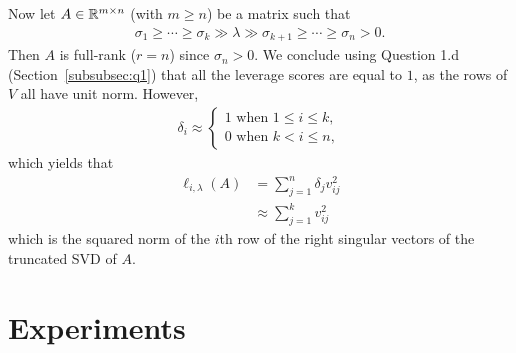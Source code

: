\documentclass{article}
\begin{document}
Now let $A \in {\mathbb R}^{m \times n}$ (with $m \geq n$) be a matrix such that
\begin{align*}
  \sigma_1 \geq \cdots \geq \sigma_k \gg \lambda \gg \sigma_{k + 1} \geq \cdots \geq \sigma_n > 0.
\end{align*}
Then $A$ is full-rank ($r = n$) since $\sigma_n > 0$.
We conclude using Question 1.d (Section~\ref{subsubsec:q1}) that all the
leverage scores are equal to $1$, as the rows of $V$ all have unit norm.
However,
\begin{align*}
  \delta_i \approx
  \begin{cases}
    1 \text{ when } 1 \leq i \leq k,\\
    0 \text{ when } k < i \leq n,
  \end{cases}
\end{align*}
which yields that
\begin{align*}
  \ell_{i,\lambda}(A) &= \sum_{j = 1}^n \delta_j v_{ij}^2\\
                      &\approx \sum_{j = 1}^k v_{ij}^2
\end{align*}
which is the squared norm of the $i$th row of the right singular vectors of
the truncated SVD of $A$.

\section{Experiments}\label{sec:experiments}
\end{document}

